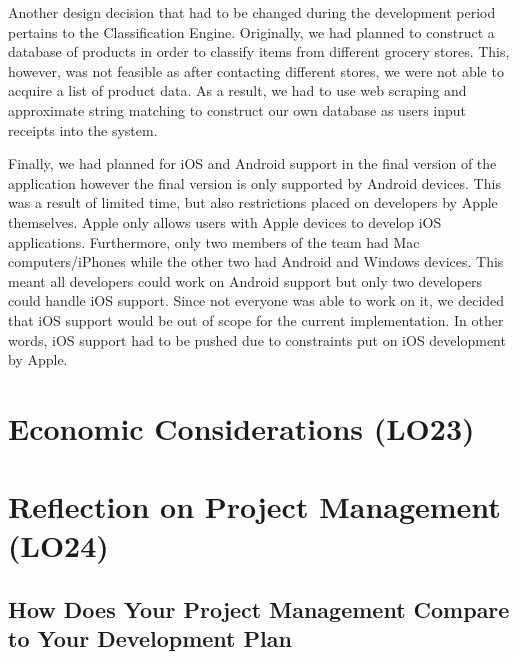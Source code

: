 \documentclass{article}
\begin{document}
Another design decision that had to be changed during the development period pertains to the Classification
Engine. Originally, we had planned to construct a database of products in order to classify items from different
grocery stores. This, however, was not feasible as after contacting different stores, we were not able to acquire
a list of product data. As a result, we had to use web scraping and approximate string matching to construct our own database
as users input receipts into the system.

Finally, we had planned for iOS and Android support in the final version of the application however the final version
is only supported by Android devices. This was a result of limited time, but also restrictions placed on developers
by Apple themselves. Apple only allows users with Apple devices to develop iOS applications. Furthermore, only two members of the
team had Mac computers/iPhones while the other two had Android and
Windows devices. This meant all developers could work on Android support but only two developers could handle iOS
support. Since not everyone was able to work on it, we decided that iOS support would be out of scope for the current
implementation. In other words, iOS support had to be pushed due to constraints put on iOS development by Apple.

\section{Economic Considerations (LO23)}


\section{Reflection on Project Management (LO24)}


\subsection{How Does Your Project Management Compare to Your Development Plan}
\end{document}
